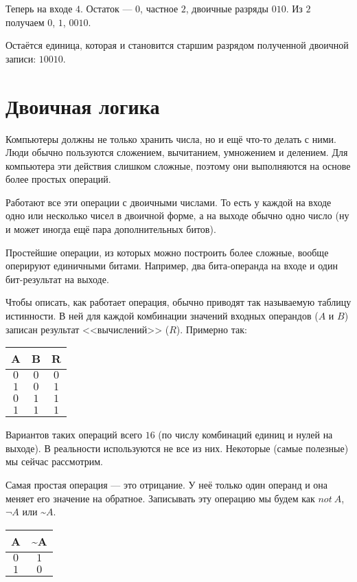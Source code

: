 Теперь на входе $4$. Остаток --- $0$, частное $2$, двоичные разряды $010$.
Из $2$ получаем $0$, $1$, $0010$.

Остаётся единица, которая и становится старшим разрядом полученной двоичной записи: $10010$.

\section{Двоичная логика}

Компьютеры должны не только хранить числа, но и ещё что-то делать с ними.
Люди обычно пользуются сложением, вычитанием, умножением и делением.
Для компьютера эти действия слишком сложные, поэтому они выполняются
на основе более простых операций.

Работают все эти операции с двоичными числами. То есть у каждой на входе
одно или несколько чисел в двоичной форме, а на выходе обычно одно число
(ну и может иногда ещё пара дополнительных битов).

Простейшие операции, из которых можно построить более сложные,
вообще оперируют единичными битами. Например, два бита-операнда
на входе и один бит-результат на выходе.

Чтобы описать, как работает операция, обычно приводят
так называемую таблицу истинности. В ней для каждой комбинации значений входных
операндов ($A$ и $B$) записан результат <<вычислений>> ($R$). Примерно так:

\begin{center}
\begin{tabular}{|c|c|c|}
 \hline
 \textbf{A} & \textbf{B} & \textbf{R} \\ \hline
 $0$ & $0$ & $0$ \\ \hline
 $1$ & $0$ & $1$ \\ \hline
 $0$ & $1$ & $1$ \\ \hline
 $1$ & $1$ & $1$ \\ \hline
\end{tabular}
\end{center}

Вариантов таких операций всего $16$ (по числу комбинаций единиц и нулей на выходе).
В реальности используются не все из них. Некоторые (самые полезные) мы сейчас рассмотрим.

Самая простая операция --- это отрицание. У неё только один операнд и она
меняет его значение на обратное. Записывать эту операцию мы будем как $not\ A$,
$\neg A$ или $\mbox{\textasciitilde}A$.

\begin{center}
\begin{tabular}{|c|c|}
 \hline
 \textbf{A} & \textbf{\textasciitilde A} \\ \hline
 $0$ & $1$ \\ \hline
 $1$ & $0$ \\ \hline
\end{tabular}
\end{center}

